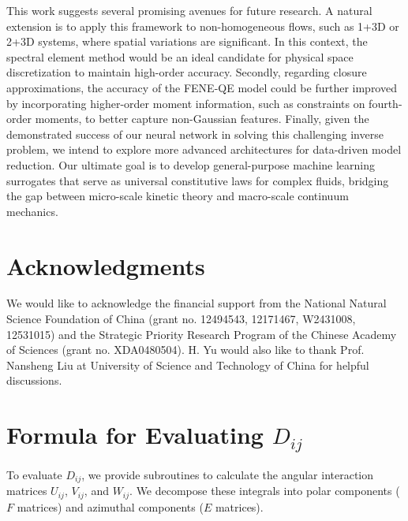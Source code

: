 \documentclass[preprint,12pt]{elsarticle}
\begin{document}
This work suggests several promising avenues for future research. A natural extension is to apply this framework to non-homogeneous flows, such as 1+3D or 2+3D systems, where spatial variations are significant. In this context, the spectral element method would be an ideal candidate for physical space discretization to maintain high-order accuracy. Secondly, regarding closure approximations, the accuracy of the FENE-QE model could be further improved by incorporating higher-order moment information, such as constraints on fourth-order moments, to better capture non-Gaussian features. Finally, given the demonstrated success of our neural network in solving this challenging inverse problem, we intend to explore more advanced architectures for data-driven model reduction. Our ultimate goal is to develop general-purpose machine learning surrogates that serve as universal constitutive laws for complex fluids, bridging the gap between micro-scale kinetic theory and macro-scale continuum mechanics.

\section*{Acknowledgments}
We would like to acknowledge the financial support from the National Natural Science Foundation of China (grant
no. 12494543, 12171467, W2431008, 12531015) and
the Strategic Priority Research Program of the Chinese Academy of Sciences (grant no. XDA0480504). H. Yu would also like to thank Prof. Nansheng Liu at University of Science and Technology of China for helpful discussions.

\appendix

\section{Formula for Evaluating $D_{ij}$}
\label{app:formula_Dij}

To evaluate $D_{ij}$, we provide subroutines to calculate the angular interaction matrices $U_{ij}$, $V_{ij}$, and $W_{ij}$. We decompose these integrals into polar components ($F$ matrices) and azimuthal components ($E$ matrices).
\end{document}
